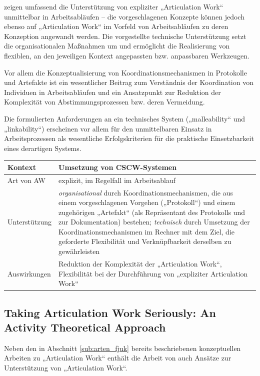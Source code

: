 \citet{Schmidt96} zeigen umfassend die Unterstützung von expliziter „Articulation Work“ unmittelbar in Arbeitsabläufen -- die vorgeschlagenen Konzepte können jedoch ebenso auf „Articulation Work“ im Vorfeld von Arbeitsabläufen zu deren Konzeption angewandt werden. Die vorgestellte technische Unterstützung setzt die organisationalen Maßnahmen um und ermöglicht die Realisierung von flexiblen, an den jeweiligen Kontext angepassten bzw. anpassbaren Werkzeugen.

Vor allem die Konzeptualisierung von Koordinationsmechanismen in Protokolle und Artefakte ist ein wesentlicher Beitrag zum Verständnis der Koordination von Individuen in Arbeitsabläufen und ein Ansatzpunkt zur Reduktion der Komplexität von Abstimmungsprozessen bzw. deren Vermeidung.

Die formulierten Anforderungen an ein technisches System („malleability“ und „linkability“) erscheinen vor allem für den unmittelbaren Einsatz in Arbeitsprozessen als wesentliche Erfolgskriterien für die praktische Einsetzbarkeit eines derartigen Systems.
\\[1em]
\begin{tabular}{| p{3cm} | p{10cm} |}
  \hline
  Kontext & Umsetzung von \gls{CSCW}-Systemen \\ \hline
  Art von AW & explizit, im Regelfall im Arbeitsablauf \\ \hline
  Unterstützung & \emph{organisational} durch Koordinationsmechanismen, die aus einem vorgeschlagenen Vorgehen („Protokoll“) und einem zugehörigen „Artefakt“ (als Repräsentant des Protokolls und zur Dokumentation) bestehen; \emph{technisch} durch Umsetzung der Koordinationsmechanismen im Rechner mit dem Ziel, die geforderte Flexibilität und Verknüpfbarkeit derselben zu gewährleisten \\ \hline
  Auswirkungen & Reduktion der Komplexität der „Articulation Work“, Flexibilität bei der Durchführung von „expliziter Articulation Work“ \\ \hline
\end{tabular}

\subsection{Taking Articulation Work Seriously: An Activity Theoretical Approach}
\label{sub:taking_articulation_work_seriously}

Neben den in Abschnitt \ref{sub:arten_fjuk} bereits beschriebenen konzeptuellen Arbeiten zu „Articulation Work“ enthält die Arbeit von \citet{Fjuk97} auch Ansätze zur Unterstützung von „Articulation Work“.

